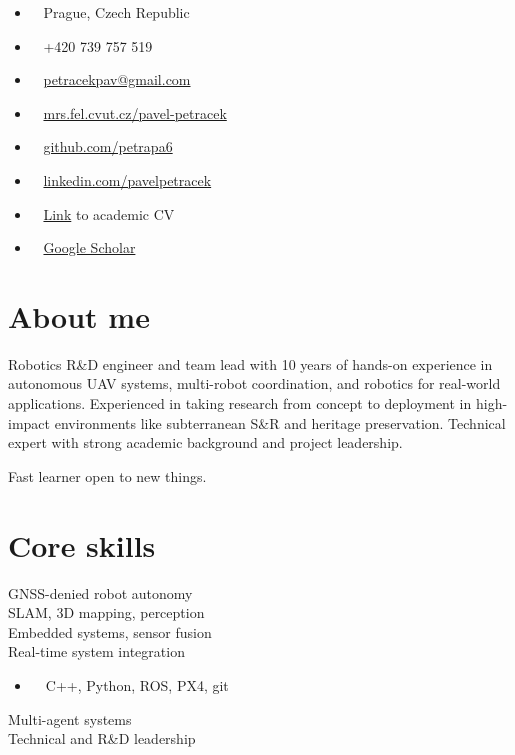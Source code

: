 \documentclass[12pt,a4paper]{article}
\newcommand\Colorhref[3][ref]{\href{#2}{\color{#1}#3}}
\begin{document}
\begin{paracol}{2}
\vspace{5mm}
\begin{itemize}
\item \faLocationArrow~ Prague, Czech Republic
\item \faPhone~ +420 739 757 519
\item \faEnvelope~ \Colorhref{mailto:petracekpav@gmail.com}{petracekpav@gmail.com}
\item \faHome~ \Colorhref{https://mrs.fel.cvut.cz/pavel-petracek}{mrs.fel.cvut.cz/pavel-petracek}
\item \faGithub~ \Colorhref{https://github.com/petrapa6}{github.com/petrapa6}
\item \faLinkedin~ \Colorhref{https://www.linkedin.com/in/pavelpetracek/}{linkedin.com/pavelpetracek}
\item \faStickyNote~ \Colorhref{https://raw.githubusercontent.com/petrapa6/cv/master/academic_cv.pdf}{Link} to academic CV
\item \faGoogle~ \Colorhref{https://scholar.google.com/citations?user=IwzN6MQAAAAJ}{Google Scholar}
\end{itemize}

\vspace{0.6em}
\section*{About me}
Robotics R\&D engineer and team lead with 10 years of hands-on experience in autonomous UAV systems, multi-robot coordination, and robotics for real-world applications.
Experienced in taking research from concept to deployment in high-impact environments like subterranean S\&R and heritage preservation.
Technical expert with strong academic background and project leadership.

\vspace{0.4em}
\noindent

\vspace{0.4em}
\noindent
Fast learner open to new things.

\vspace{0.6em}
\section*{Core skills}
GNSS-denied robot autonomy\\
SLAM, 3D mapping, perception\\
Embedded systems, sensor fusion\\
Real-time system integration
\begin{itemize}
  \item ~~C++, Python, ROS, PX4, git
\end{itemize}
Multi-agent systems\\
Technical and R\&D leadership


\end{paracol}
\end{document}

